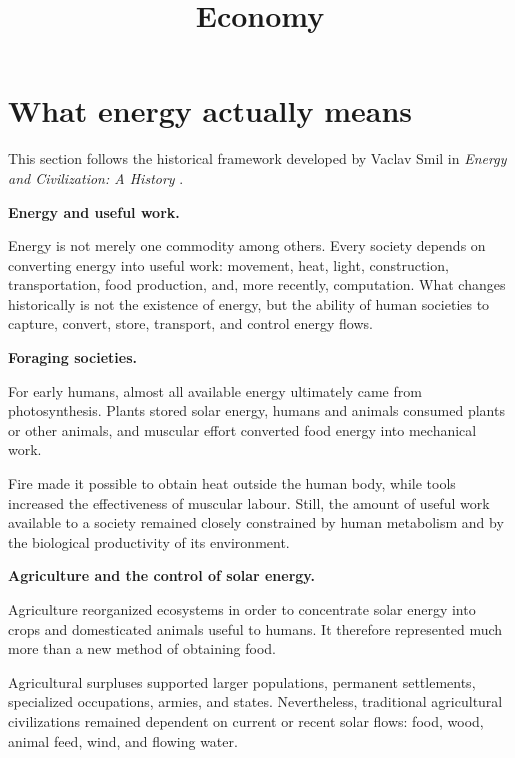 



\title{Economy}
\maketitle

\label{section-phantom}

\tableofcontents

\section{What energy actually means}
\label{section-energy-means}

\noindent
This section follows the historical
framework developed by Vaclav Smil in
\emph{Energy and Civilization: A History}
\cite{smil2017energy}.

\medskip\noindent
{\bf Energy and useful work.}

Energy is not merely one commodity among
others. Every society depends on converting
energy into useful work: movement, heat,
light, construction, transportation, food
production, and, more recently,
computation. What changes historically is
not the existence of energy, but the ability
of human societies to capture, convert,
store, transport, and control energy flows.

\medskip\noindent
{\bf Foraging societies.}

For early humans, almost all available
energy ultimately came from photosynthesis.
Plants stored solar energy, humans and
animals consumed plants or other animals,
and muscular effort converted food energy
into mechanical work.

Fire made it possible to obtain heat outside
the human body, while tools increased the
effectiveness of muscular labour. Still,
the amount of useful work available to a
society remained closely constrained by
human metabolism and by the biological
productivity of its environment.

\medskip\noindent
{\bf Agriculture and the control of solar
energy.}

Agriculture reorganized ecosystems in order
to concentrate solar energy into crops and
domesticated animals useful to humans. It
therefore represented much more than a new
method of obtaining food.

Agricultural surpluses supported larger
populations, permanent settlements,
specialized occupations, armies, and
states. Nevertheless, traditional
agricultural civilizations remained
dependent on current or recent solar flows:
food, wood, animal feed, wind, and flowing
water.

